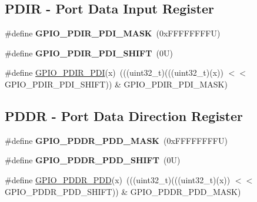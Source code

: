 \subsection*{P\+D\+IR -\/ Port Data Input Register}
\begin{DoxyCompactItemize}
\item 
\mbox{\label{group___f_g_p_i_o___register___masks_gacb7c8cc976937906c8e803811a7fbb68}} 
\#define {\bfseries G\+P\+I\+O\+\_\+\+P\+D\+I\+R\+\_\+\+P\+D\+I\+\_\+\+M\+A\+SK}~(0x\+F\+F\+F\+F\+F\+F\+F\+F\+U)
\item 
\mbox{\label{group___f_g_p_i_o___register___masks_ga99fd9212dd769bb1964a28a864c6c741}} 
\#define {\bfseries G\+P\+I\+O\+\_\+\+P\+D\+I\+R\+\_\+\+P\+D\+I\+\_\+\+S\+H\+I\+FT}~(0\+U)
\item 
\#define \mbox{\hyperlink{group___f_g_p_i_o___register___masks_ga8f80c8e42743151c73569b5cef49f2b2}{G\+P\+I\+O\+\_\+\+P\+D\+I\+R\+\_\+\+P\+DI}}(x)~(((uint32\+\_\+t)(((uint32\+\_\+t)(x)) $<$$<$ G\+P\+I\+O\+\_\+\+P\+D\+I\+R\+\_\+\+P\+D\+I\+\_\+\+S\+H\+I\+FT)) \& G\+P\+I\+O\+\_\+\+P\+D\+I\+R\+\_\+\+P\+D\+I\+\_\+\+M\+A\+SK)
\end{DoxyCompactItemize}
\subsection*{P\+D\+DR -\/ Port Data Direction Register}
\begin{DoxyCompactItemize}
\item 
\mbox{\label{group___f_g_p_i_o___register___masks_ga67567a60f48d2bfb5584cd8de8936788}} 
\#define {\bfseries G\+P\+I\+O\+\_\+\+P\+D\+D\+R\+\_\+\+P\+D\+D\+\_\+\+M\+A\+SK}~(0x\+F\+F\+F\+F\+F\+F\+F\+F\+U)
\item 
\mbox{\label{group___f_g_p_i_o___register___masks_gacdd12c96f7650759c90a98bb606bd776}} 
\#define {\bfseries G\+P\+I\+O\+\_\+\+P\+D\+D\+R\+\_\+\+P\+D\+D\+\_\+\+S\+H\+I\+FT}~(0\+U)
\item 
\#define \mbox{\hyperlink{group___f_g_p_i_o___register___masks_ga9836cb3ac719630f741fe6a0292083fc}{G\+P\+I\+O\+\_\+\+P\+D\+D\+R\+\_\+\+P\+DD}}(x)~(((uint32\+\_\+t)(((uint32\+\_\+t)(x)) $<$$<$ G\+P\+I\+O\+\_\+\+P\+D\+D\+R\+\_\+\+P\+D\+D\+\_\+\+S\+H\+I\+FT)) \& G\+P\+I\+O\+\_\+\+P\+D\+D\+R\+\_\+\+P\+D\+D\+\_\+\+M\+A\+SK)
\end{DoxyCompactItemize}


